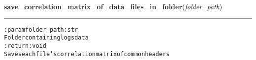     \label{hal:ml:analysis:correlation:save_correlation_matrix_of_data_files_in_folder}

    \vspace{0.5ex}

\hspace{.8\funcindent}\begin{boxedminipage}{\funcwidth}

    \raggedright \textbf{save\_correlation\_matrix\_of\_data\_files\_in\_folder}(\textit{folder\_path})

    \vspace{-1.5ex}

    \rule{\textwidth}{0.5\fboxrule}
\setlength{\parskip}{2ex}
\begin{alltt}

:param folder\_path: str
    Folder containing logs data
:return: void
    Saves each file's correlation matrix of common headers
\end{alltt}

\setlength{\parskip}{1ex}
    \end{boxedminipage}

